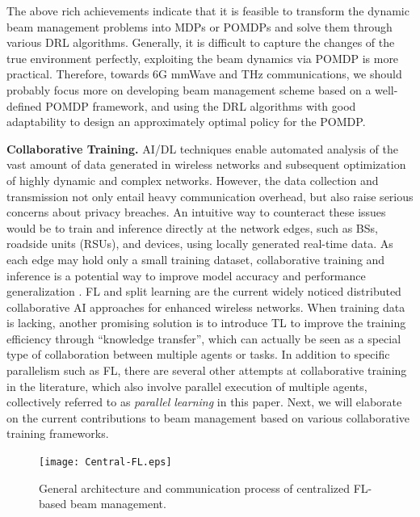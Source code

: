 \documentclass[journal,comsoc]{IEEEtran}
\begin{document}
The above rich achievements indicate that it is feasible to transform the dynamic beam management problems into MDPs or POMDPs and solve them through various DRL algorithms. Generally, it is difficult to capture the changes of the true environment perfectly, exploiting the beam dynamics via POMDP is more practical. Therefore, towards 6G mmWave and THz communications, we should probably focus more on developing beam management scheme based on a  well-defined POMDP framework, and using the DRL algorithms with good adaptability to design an approximately optimal policy for the POMDP.



{\bf{Collaborative Training.}} AI/DL techniques enable automated analysis of the vast amount of data generated in wireless networks and subsequent optimization of highly dynamic and complex networks. However, the data collection and transmission not only entail heavy communication overhead, but also raise serious concerns about privacy breaches. An intuitive way to counteract these issues would be to train and inference directly at the network edges, such as BSs, roadside units (RSUs), and devices, using locally generated real-time data. As each edge may hold only a small training dataset, collaborative training and inference is a potential way to improve model accuracy and performance generalization \cite{Edge-Artificial-Intelligence-6G-2022,AI-in-6G-2022,Distributed-Artificial-Intelligence-End-Edge-Cloud-2023,Energy-Efficient-Mobile-Edge-Computing-2022}. FL and split learning are the current widely noticed distributed collaborative AI approaches for enhanced wireless networks. When training data is lacking, another promising solution is to introduce TL to improve the training efficiency through ``knowledge transfer'', which can actually be seen as a special type of collaboration between multiple agents or tasks. In addition to specific parallelism such as FL, there are several other attempts at collaborative training in the literature, which also involve parallel execution of multiple agents, collectively referred to as \emph{parallel learning} in this paper. Next, we will elaborate on the current contributions to beam management based on various collaborative training frameworks.


\begin{figure}[t]
	\centering
	\texttt{[image: Central-FL.eps]}
	\caption{General architecture and communication process of centralized FL-based beam management.}
	\label{fig:Central-FL}
\end{figure}
\end{document}
